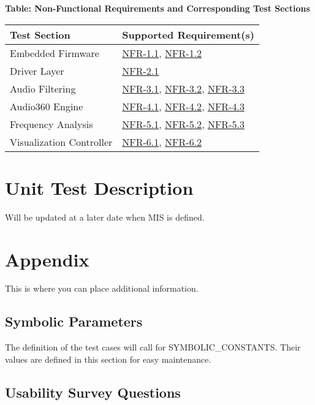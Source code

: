 \documentclass[12pt, titlepage]{article}
\begin{document}
\noindent
\textbf{Table: Non-Functional Requirements and Corresponding Test Sections}

\noindent
\begin{tabular}{|l|l|}
\hline
\textbf{Test Section} & \textbf{Supported Requirement(s)} \\ \hline
Embedded Firmware & \hyperref[SRS-NFR1_1]{NFR-1.1},
\hyperref[SRS-NFR1_2]{NFR-1.2} \\ \hline
Driver Layer & \hyperref[SRS-NFR2_1]{NFR-2.1} \\ \hline
Audio Filtering & \hyperref[SRS-NFR3_1]{NFR-3.1},
\hyperref[SRS-NFR3_2]{NFR-3.2}, \hyperref[SRS-NFR3_3]{NFR-3.3} \\ \hline
Audio360 Engine & \hyperref[SRS-NFR4_1]{NFR-4.1},
\hyperref[SRS-NFR4_2]{NFR-4.2}, \hyperref[SRS-NFR4_3]{NFR-4.3} \\ \hline
Frequency Analysis & \hyperref[SRS-NFR5_1]{NFR-5.1},
\hyperref[SRS-NFR5_2]{NFR-5.2}, \hyperref[SRS-NFR5_3]{NFR-5.3} \\ \hline
Visualization Controller & \hyperref[SRS-NFR6_1]{NFR-6.1},
\hyperref[SRS-NFR6_2]{NFR-6.2} \\ \hline
\end{tabular}

\section{Unit Test Description}

Will be updated at a later date when MIS is defined.



\newpage

\section{Appendix}

This is where you can place additional information.

\subsection{Symbolic Parameters}

The definition of the test cases will call for SYMBOLIC\_CONSTANTS. Their values
are defined in this section for easy maintenance.

\subsection{Usability Survey Questions}\label{sec:usability_survery_questions}
\end{document}
